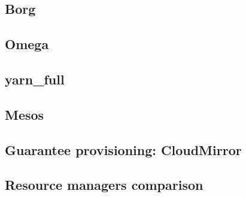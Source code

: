 

\subsection{Borg \texorpdfstring{\cite{borg}}{}}

\newpage

\subsection{Omega \texorpdfstring{\cite{omega}}{}} \label{omega}

\newpage

\subsection{\texorpdfstring{\glsdesc{yarn_full}}{}}

\newpage

\subsection{Mesos \texorpdfstring{\cite{mesos}}{}}

\newpage

\subsection{Guarantee provisioning: CloudMirror \texorpdfstring{\cite{cloudmirror}}{}}

\newpage

\subsection{Resource managers comparison}
